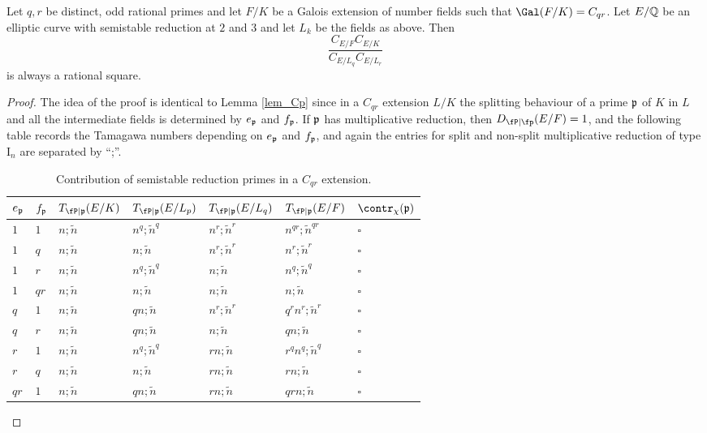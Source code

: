\begin{lemma}\label{lem_Cpq}
    Let $q,r$ be distinct, odd rational primes and let $F/K$ be a Galois extension of number fields such that $\Gal(F/K)=C_{qr}$. Let $E/\mathbb{Q}$ be an elliptic curve with semistable reduction at $2$ and $3$ and let $L_k$ be the fields as above. Then
    $$\frac{C_{E/F}C_{E/K}}{C_{E/L_q}C_{E/L_r}}$$
    is always a rational square.
\end{lemma}

\begin{proof}
    The idea of the proof is identical to Lemma \ref{lem_Cp} since in a $C_{qr}$ extension $L/K$ the splitting behaviour of a prime $\mathfrak{p}$ of $K$ in $L$ and all the intermediate fields is determined by $e_{\mathfrak{p}}$ and $f_{\mathfrak{p}}$. If $\mathfrak{p}$ has multiplicative reduction, then $D_{\fP\mid\fp}(E/F)=1$, and the following table records the Tamagawa numbers depending on $e_{\mathfrak{p}}$ and $f_{\mathfrak{p}}$, and again the entries for split and non-split multiplicative reduction of type $\mathrm{I}_n$ are separated by ``;''.

    \begin{table}[!ht]
        \centering
        \begin{tabular}{|l|l|l|l|l|l|l|}
        \hline
        $e_{\mathfrak{p}}$ & $f_{\mathfrak{p}}$  & $T_{\fP\mid \pp}(E/K)$ & $T_{\fP\mid \pp}(E/L_p)$ & $T_{\fP\mid \pp}(E/L_q)$ & $T_{\fP\mid \pp}(E/F)$ & $\contr_\chi(\pp)$ \\ \hline
        $1$ & $1$ & $n;\tilde{n}$ & $n^q;\tilde{n}^q$ & $n^r;\tilde{n}^r$ & $n^{qr};\tilde{n}^{qr}$ & $\square$ \\ \hline
        $1$ & $q$ & $n;\tilde{n}$ & $n;\tilde{n}$ & $n^r;\tilde{n}^r$ & $n^r;\tilde{n}^r$ & $\square$ \\ \hline
        $1$ & $r$ & $n;\tilde{n}$ & $n^q;\tilde{n}^q$ & $n;\tilde{n}$ & $n^q;\tilde{n}^q$ & $\square$ \\ \hline
        $1$ & $qr$ & $n;\tilde{n}$ & $n;\tilde{n}$ & $n;\tilde{n}$ & $n;\tilde{n}$ & $\square$ \\ \hline
        $q$ & $1$ & $n;\tilde{n}$ & $qn;\tilde{n}$ & $n^r;\tilde{n}^r$ & $q^rn^r;\tilde{n}^r$ & $\square$ \\ \hline
        $q$ & $r$ & $n;\tilde{n}$ & $qn;\tilde{n}$ & $n;\tilde{n}$ & $qn;\tilde{n}$ & $\square$ \\ \hline
        $r$ & $1$ & $n;\tilde{n}$ & $n^q;\tilde{n}^q$ & $rn;\tilde{n}$ & $r^qn^q;\tilde{n}^q$ & $\square$ \\ \hline
        $r$ & $q$ & $n;\tilde{n}$ & $n;\tilde{n}$ & $rn;\tilde{n}$ & $rn;\tilde{n}$ & $\square$ \\ \hline
        $qr$ & $1$ & $n;\tilde{n}$ & $qn;\tilde{n}$ & $rn;\tilde{n}$ & $qrn;\tilde{n}$ & $\square$ \\ \hline
        \end{tabular}
        \caption{Contribution of semistable reduction primes in a $C_{qr}$ extension.}
    \end{table}


\end{proof}
